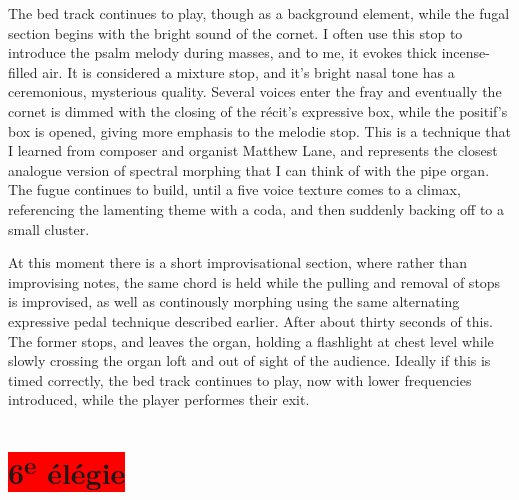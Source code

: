 \documentclass[12pt,twoside,maitrise]{dms_ks}
\theoremstyle{definition}
\begin{document}
{


The bed track continues to play, though as a background element, while the fugal section begins with the bright sound of the cornet. I often use this stop to introduce the psalm melody during masses, and to me, it evokes thick incense-filled air. It is considered a mixture stop, and it's bright nasal tone has a ceremonious, mysterious quality. Several voices enter the fray and eventually the cornet is dimmed with the closing of the récit's expressive box, while the positif's box is opened, giving more emphasis to the melodie stop. This is a technique that I learned from composer and organist Matthew Lane, and represents the closest analogue version of spectral morphing that I can think of with the pipe organ. The fugue continues to build, until a five voice texture comes to a climax, referencing the lamenting theme with a coda, and then suddenly backing off to a small cluster.



At this moment there is a short improvisational section, where rather than improvising notes, the same chord is held while the pulling and removal of stops is improvised, as well as continously morphing using the same alternating expressive pedal technique described earlier. After about thirty seconds of this. The former stops, and leaves the organ, holding a flashlight at chest level while slowly crossing the organ loft and out of sight of the audience. Ideally if this is timed correctly, the bed track continues to play, now with lower frequencies introduced, while the player performes their exit.


\section{\colorbox{red}{6\textsuperscript{e} élégie}}

}
\end{document}

